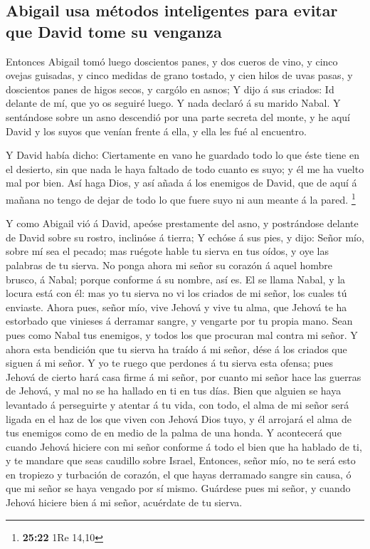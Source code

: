 \hypertarget{abigail-usa-muxe9todos-inteligentes-para-evitar-que-david-tome-su-venganza}{%
\subsection{Abigail usa métodos inteligentes para evitar que David tome
su
venganza}\label{abigail-usa-muxe9todos-inteligentes-para-evitar-que-david-tome-su-venganza}}

 Entonces Abigail tomó luego doscientos panes, y dos
cueros de vino, y cinco ovejas guisadas, y cinco medidas de grano
tostado, y cien hilos de uvas pasas, y doscientos panes de higos secos,
y cargólo en asnos;  Y dijo á sus criados: Id delante de
mí, que yo os seguiré luego. Y nada declaró á su marido Nabal.
 Y sentándose sobre un asno descendió por una parte
secreta del monte, y he aquí David y los suyos que venían frente á ella,
y ella les fué al encuentro.

 Y David había dicho: Ciertamente en vano he guardado
todo lo que éste tiene en el desierto, sin que nada le haya faltado de
todo cuanto es suyo; y él me ha vuelto mal por bien.  Así
haga Dios, y así añada á los enemigos de David, que de aquí á mañana no
tengo de dejar de todo lo que fuere suyo ni aun meante á la pared.
\footnote{\textbf{25:22} 1Re 14,10}

 Y como Abigail vió á David, apeóse prestamente del asno,
y postrándose delante de David sobre su rostro, inclinóse á tierra;
 Y echóse á sus pies, y dijo: Señor mío, sobre mí sea el
pecado; mas ruégote hable tu sierva en tus oídos, y oye las palabras de
tu sierva.  No ponga ahora mi señor su corazón á aquel
hombre brusco, á Nabal; porque conforme á su nombre, así es. El se llama
Nabal, y la locura está con él: mas yo tu sierva no vi los criados de mi
señor, los cuales tú enviaste.  Ahora pues, señor mío,
vive Jehová y vive tu alma, que Jehová te ha estorbado que vinieses á
derramar sangre, y vengarte por tu propia mano. Sean pues como Nabal tus
enemigos, y todos los que procuran mal contra mi señor. 
Y ahora esta bendición que tu sierva ha traído á mi señor, dése á los
criados que siguen á mi señor.  Y yo te ruego que
perdones á tu sierva esta ofensa; pues Jehová de cierto hará casa firme
á mi señor, por cuanto mi señor hace las guerras de Jehová, y mal no se
ha hallado en ti en tus días.  Bien que alguien se haya
levantado á perseguirte y atentar á tu vida, con todo, el alma de mi
señor será ligada en el haz de los que viven con Jehová Dios tuyo, y él
arrojará el alma de tus enemigos como de en medio de la palma de una
honda.  Y acontecerá que cuando Jehová hiciere con mi
señor conforme á todo el bien que ha hablado de ti, y te mandare que
seas caudillo sobre Israel,  Entonces, señor mío, no te
será esto en tropiezo y turbación de corazón, el que hayas derramado
sangre sin causa, ó que mi señor se haya vengado por sí mismo. Guárdese
pues mi señor, y cuando Jehová hiciere bien á mi señor, acuérdate de tu
sierva.

